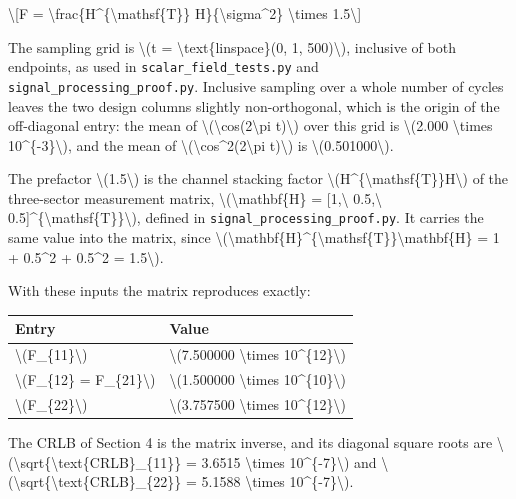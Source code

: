 \documentclass[
  10pt,
]{article}
\begin{document}
\textbackslash{[}F =
\textbackslash frac\{H\^{}\{\textbackslash mathsf\{T\}\}
H\}\{\textbackslash sigma\^{}2\} \textbackslash times
1.5\textbackslash{]}

The sampling grid is \textbackslash(t =
\textbackslash text\{linspace\}(0, 1, 500)\textbackslash), inclusive of
both endpoints, as used in \texttt{scalar\_field\_tests.py} and
\texttt{signal\_processing\_proof.py}. Inclusive sampling over a whole
number of cycles leaves the two design columns slightly non-orthogonal,
which is the origin of the off-diagonal entry: the mean of
\textbackslash(\textbackslash cos(2\textbackslash pi t)\textbackslash)
over this grid is \textbackslash(2.000 \textbackslash times
10\^{}\{-3\}\textbackslash), and the mean of
\textbackslash(\textbackslash cos\^{}2(2\textbackslash pi
t)\textbackslash) is \textbackslash(0.501000\textbackslash).

The prefactor \textbackslash(1.5\textbackslash) is the channel stacking
factor
\textbackslash(H\^{}\{\textbackslash mathsf\{T\}\}H\textbackslash) of
the three-sector measurement matrix,
\textbackslash(\textbackslash mathbf\{H\} = {[}1,\textbackslash{}
0.5,\textbackslash{}
0.5{]}\^{}\{\textbackslash mathsf\{T\}\}\textbackslash), defined in
\texttt{signal\_processing\_proof.py}. It carries the same value into
the matrix, since
\textbackslash(\textbackslash mathbf\{H\}\^{}\{\textbackslash mathsf\{T\}\}\textbackslash mathbf\{H\}
= 1 + 0.5\^{}2 + 0.5\^{}2 = 1.5\textbackslash).

With these inputs the matrix reproduces exactly:

\begin{longtable}[]{@{}ll@{}}
\toprule\noalign{}
Entry & Value \\
\midrule\noalign{}
\endhead
\bottomrule\noalign{}
\endlastfoot
\textbackslash(F\_\{11\}\textbackslash) & \textbackslash(7.500000
\textbackslash times 10\^{}\{12\}\textbackslash) \\
\textbackslash(F\_\{12\} = F\_\{21\}\textbackslash) &
\textbackslash(1.500000 \textbackslash times
10\^{}\{10\}\textbackslash) \\
\textbackslash(F\_\{22\}\textbackslash) & \textbackslash(3.757500
\textbackslash times 10\^{}\{12\}\textbackslash) \\
\end{longtable}

The CRLB of Section 4 is the matrix inverse, and its diagonal square
roots are
\textbackslash(\textbackslash sqrt\{\textbackslash text\{CRLB\}\_\{11\}\}
= 3.6515 \textbackslash times 10\^{}\{-7\}\textbackslash) and
\textbackslash(\textbackslash sqrt\{\textbackslash text\{CRLB\}\_\{22\}\}
= 5.1588 \textbackslash times 10\^{}\{-7\}\textbackslash).
\end{document}
